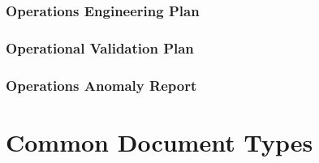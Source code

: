 \subsection{Operations Engineering Plan}
\label{sec:Operations Engineering Plan}


\subsection{Operational Validation Plan}
\label{sec:Operational Validation Plan}


\subsection{Operations Anomaly Report}
\label{sec:Operations Anomaly Report}


\clearpage
\chapter{Common Document Types}
\label{sec:Common Document Types}

